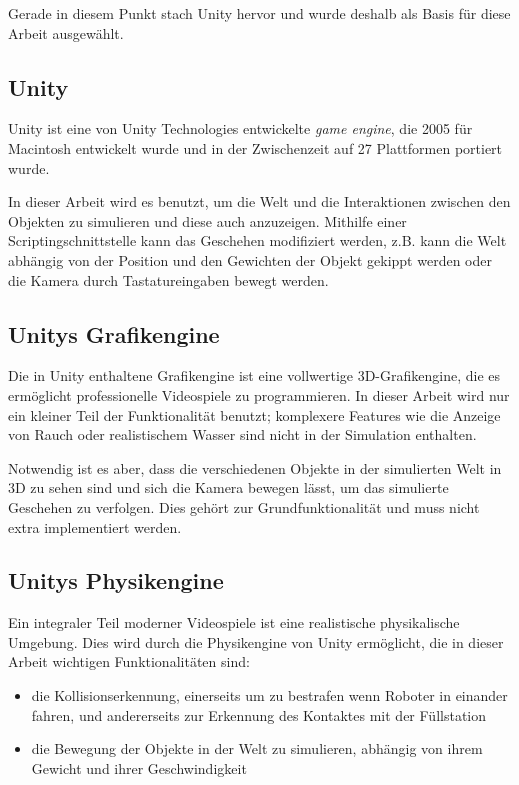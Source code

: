 Gerade in diesem Punkt stach Unity hervor und wurde deshalb als Basis f{\"{u}}r diese Arbeit ausgew{\"{a}}hlt.

\subsection{Unity}
Unity ist eine von Unity Technologies entwickelte \textit{game engine}, die 2005 f{\"{u}}r Macintosh entwickelt wurde und in der Zwischenzeit auf 27 Plattformen portiert wurde.

In dieser Arbeit wird es benutzt, um die Welt und die Interaktionen zwischen den Objekten zu simulieren und diese auch anzuzeigen. Mithilfe einer Scriptingschnittstelle kann das Geschehen modifiziert werden, z.B. kann die Welt
abh{\"{a}}ngig von der Position und den Gewichten der Objekt gekippt werden oder die Kamera durch Tastatureingaben bewegt werden.

\subsection{Unitys Grafikengine}
Die in Unity enthaltene Grafikengine ist eine vollwertige 3D-Grafikengine, die es erm{\"{o}}glicht professionelle Videospiele zu programmieren. In dieser Arbeit wird nur
ein kleiner Teil der Funktionalit{\"{a}}t benutzt; komplexere Features wie die Anzeige von Rauch oder realistischem Wasser sind nicht in der Simulation enthalten.

Notwendig ist es aber, dass die verschiedenen Objekte in der simulierten Welt in 3D zu sehen sind und sich die Kamera bewegen l{\"{a}}sst, um das simulierte Geschehen zu
verfolgen. Dies geh{\"{o}}rt zur Grundfunktionalit{\"{a}}t und muss nicht extra implementiert werden.

\subsection{Unitys Physikengine}
Ein integraler Teil moderner Videospiele ist eine realistische physikalische Umgebung. Dies wird durch die Physikengine von Unity erm{\"{o}}glicht, die in dieser Arbeit wichtigen Funktionalit{\"{a}}ten sind:

\begin{itemize}
\item die Kollisionserkennung, einerseits um zu bestrafen wenn Roboter in einander fahren,
	und andererseits zur Erkennung des Kontaktes mit der F{\"{u}}llstation
\item die Bewegung der Objekte in der Welt zu simulieren, abh{\"{a}}ngig von ihrem Gewicht und ihrer Geschwindigkeit
\end{itemize}

